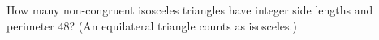 How many non-congruent isosceles triangles have integer side lengths and perimeter $48$? (An equilateral triangle counts as isosceles.)

